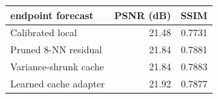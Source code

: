 \begin{tabular}{@{}lrr@{}}
\toprule
endpoint forecast & PSNR (dB) & SSIM \\
\midrule
Calibrated local & 21.48 & 0.7731 \\
Pruned 8-NN residual & 21.84 & 0.7881 \\
Variance-shrunk cache & 21.84 & 0.7883 \\
Learned cache adapter & 21.92 & 0.7877 \\
\bottomrule
\end{tabular}
